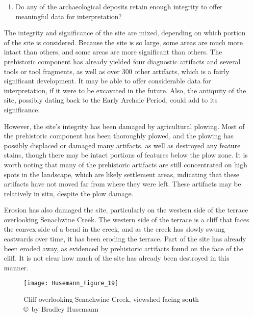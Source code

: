 \begin{enumerate}[resume]
	\item Do any of the archaeological deposits retain enough integrity to offer meaningful data for interpretation?
\end{enumerate}

The integrity and significance of the site are mixed, depending on which portion of the site is considered. Because the site is so large, some areas are much more intact than others, and some areas are more significant than others.
The prehistoric component has already yielded four diagnostic artifacts and several tools or tool fragments, as well as over 300 other artifacts, which is a fairly significant development. It may be able to offer considerable data for interpretation, if it were to be excavated in the future. Also, the antiquity of the site, possibly dating back to the Early Archaic Period, could add to its significance.

However, the site’s integrity has been damaged by agricultural plowing. Most of the prehistoric component has been thoroughly plowed, and the plowing has possibly displaced or damaged many artifacts, as well as destroyed any feature stains, though there may be intact portions of features below the plow zone. It is worth noting that many of the prehistoric artifacts are still concentrated on high spots in the landscape, which are likely settlement areas, indicating that these artifacts have not moved far from where they were left. These artifacts may be relatively in situ, despite the plow damage.

Erosion has also damaged the site, particularly on the western side of the terrace overlooking Senachwine Creek. The western side of the terrace is a cliff that faces the convex side of a bend in the creek, and as the creek has slowly swung eastwards over time, it has been eroding the terrace. Part of the site has already been eroded away, as evidenced by prehistoric artifacts found on the face of the cliff. It is not clear how much of the site has already been destroyed in this manner.


\begin{figure}[!htb]
	\texttt{[image: Husemann\_Figure\_19]}
	\caption{Cliff overlooking Senachwine Creek, viewshed facing south
		{\normalfont\scriptsize \\ \copyright\ by Bradley Husemann
	}}
	\label{fig:Husemann_Figure_19}
\end{figure}

